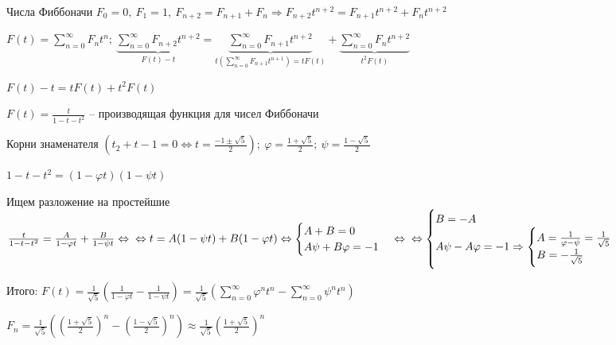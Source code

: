 \documentclass[12pt]{article}
\begin{document}
\begin{Example}{Числа Фиббоначи}
    $F_0 = 0,\ F_1 = 1,\ F_{n + 2} = F_{n + 1} + F_n \Rightarrow F_{n + 2}t^{n + 2} = F_{n + 1}t^{n + 2} + F_n t^{n + 2}$

    $F(t) = \sum\limits_{n = 0}^\infty F_n t^n;\ \underbrace{\sum\limits_{n = 0}^\infty F_{n + 2}t^{n + 2}}_{F(t) - t} = \underbrace{\sum\limits_{n = 0}^\infty F_{n + 1}t^{n + 2}}_{t (\sum\limits_{n = 0}^\infty F_{n + 1}t^{n + 1}) = tF(t)} + \underbrace{\sum\limits_{n = 0}^\infty F_nt^{n + 2}}_{t^2F(t)}$

    $F(t) - t = tF(t) + t^2F(t)$

    $F(t) = \frac{t}{1 - t - t^2}$ -- производящая функция для чисел Фиббоначи

    Корни знаменателя $(t_2 + t - 1 = 0 \Leftrightarrow t = \frac{-1 \pm \sqrt{5}}{2});\ \varphi = \frac{1 + \sqrt{5}}{2};\ \psi = \frac{1 - \sqrt{5}}{2}$

    $1 - t - t^2 = (1 - \varphi t)(1 - \psi t)$

    Ищем разложение на простейшие $\frac{t}{1 - t - t^2} = \frac{A}{1 - \varphi t} + \frac{B}{1 - \psi t} \Leftrightarrow \\ 
    \Leftrightarrow t = A(1 - \psi t) + B(1 - \varphi t) \Leftrightarrow \begin{cases}
        A + B = 0 \\
        A \psi + B \varphi = -1
    \end{cases} \Leftrightarrow  \\ \Leftrightarrow \begin{cases}
        B = -A \\
        A \psi - A \varphi = - 1 \Rightarrow  \begin{cases}
            A = \frac{1}{\varphi - \psi} = \frac{1}{\sqrt{5}} \\
            B = - \frac{1}{\sqrt{5}}
        \end{cases}
    \end{cases}$

    Итого: $F(t) = \frac{1}{\sqrt{5}}(\frac{1}{1 - \varphi t} - \frac{1}{1 - \psi t}) = \frac{1}{\sqrt{5}}(\sum\limits_{n = 0}^\infty \varphi^nt^n - \sum\limits_{n = 0}^\infty \psi^nt^n)$

    $F_n = \frac{1}{\sqrt{5}}((\frac{1 + \sqrt{5}}{2})^n - (\frac{1 - \sqrt{5}}{2})^n) \approx \frac{1}{\sqrt{5}}(\frac{1 + \sqrt{5}}{2})^n$
\end{Example}
\end{document}

